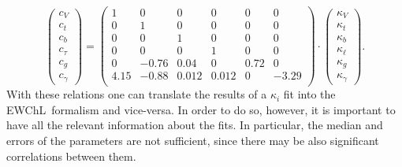 \begin{equation}
  \label{eq:kappa.EFT.7}
  \begin{pmatrix}
    c_{V}\\
    c_{t}\\
    c_{b}\\
    c_{\tau}\\
    c_{g}\\
    c_{\gamma}
  \end{pmatrix}
  = 
  \begin{pmatrix}
    1 & 0 & 0 & 0 & 0 & 0 \\
    0 & 1 & 0 & 0 & 0 & 0 \\
    0 & 0 & 1 & 0 & 0 & 0 \\
    0 & 0 & 0 & 1 & 0 & 0 \\
    0 & -0.76 & 0.04 & 0 & 0.72 & 0 \\
    4.15 & -0.88 & 0.012 & 0.012 & 0 & -3.29 \\
  \end{pmatrix}
  \cdot
  \begin{pmatrix}
    \kappa_{V}\\
    \kappa_{t}\\
    \kappa_{b}\\
    \kappa_{\ell}\\
    \kappa_{g}\\
    \kappa_{\gamma}
  \end{pmatrix}.
\end{equation}
%
With these relations one can translate the results of a $\kappa_i$ fit into the EWChL~formalism and vice-versa. 
In order to do so, however, it is important to have all the relevant information about the fits. In particular,
the median and errors of the parameters are not sufficient, since there may be also significant correlations between them. 